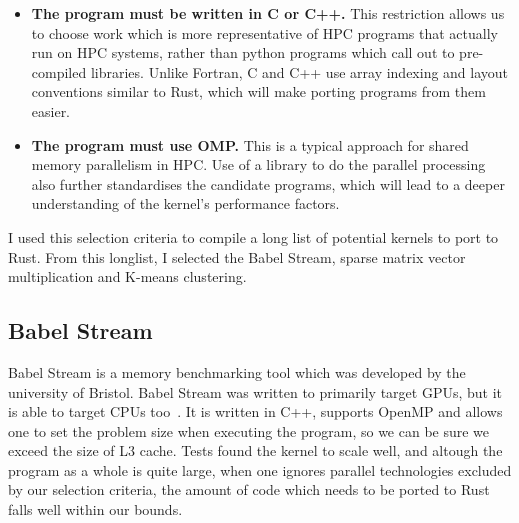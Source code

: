 \begin{itemize}
  \item \textbf{The program must be written in C or C++.} This restriction allows us to choose work which is more representative of HPC programs that actually run on HPC systems, rather than python programs which call out to pre-compiled libraries. Unlike Fortran, C and C++ use array indexing and layout conventions similar to Rust, which will make porting programs from them easier.

  \item \textbf{The program must use OMP.} This is a typical approach for shared memory parallelism in HPC. Use of a library to do the parallel processing also further standardises the candidate programs, which will lead to a deeper understanding of the kernel's performance factors.
\end{itemize}

I used this selection criteria to compile a long list of potential kernels to port to Rust. From this longlist, I selected the Babel Stream, sparse matrix vector multiplication and K-means clustering.

\subsection{Babel Stream}

Babel Stream is a memory benchmarking tool which was developed by the university of Bristol. Babel Stream was written to primarily target GPUs, but it is able to target CPUs too~\cite{BabelStream}.  It is written in C++, supports OpenMP and allows one to set the problem size when executing the program, so we can be sure we exceed the size of L3 cache. Tests found the kernel to scale well, and altough the program as a whole is quite large, when one ignores parallel technologies excluded by our selection criteria, the amount of code which needs to be ported to Rust falls well within our bounds.

